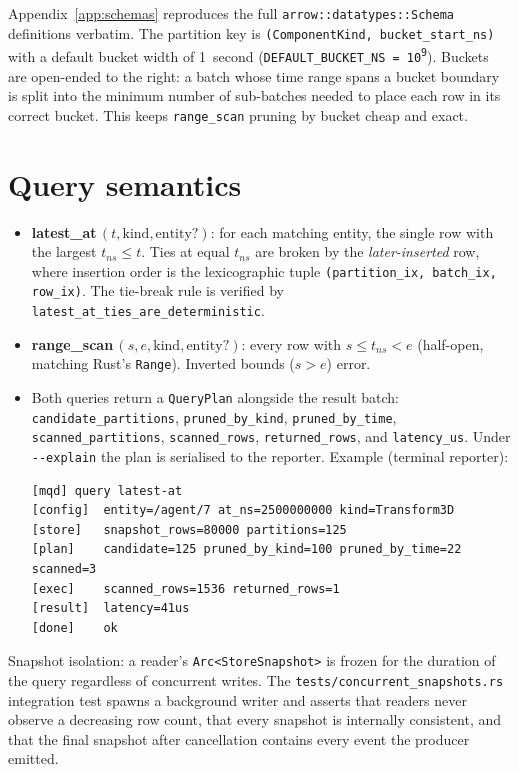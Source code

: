 \documentclass[11pt]{article}
\begin{document}
Appendix~\ref{app:schemas} reproduces the full \texttt{arrow::datatypes::Schema}
definitions verbatim. The partition key is \texttt{(ComponentKind, bucket\_start\_ns)}
with a default bucket width of 1~second (\texttt{DEFAULT\_BUCKET\_NS = 10\textsuperscript{9}}).
Buckets are open-ended to the right: a batch whose time range spans a bucket boundary
is split into the minimum number of sub-batches needed to place each row in its correct
bucket. This keeps \texttt{range\_scan} pruning by bucket cheap and exact.

\section{Query semantics}

\begin{itemize}
  \item \textbf{latest\_at}\,$(t, \mathrm{kind}, \mathrm{entity}?)$: for each matching
    entity, the single row with the largest $t_{ns} \le t$. Ties at equal $t_{ns}$ are
    broken by the \emph{later-inserted} row, where insertion order is the lexicographic
    tuple \texttt{(partition\_ix, batch\_ix, row\_ix)}. The tie-break rule is
    verified by \texttt{latest\_at\_ties\_are\_deterministic}.
  \item \textbf{range\_scan}\,$(s, e, \mathrm{kind}, \mathrm{entity}?)$: every row
    with $s \le t_{ns} < e$ (half-open, matching Rust's \texttt{Range}). Inverted
    bounds ($s > e$) error.
  \item Both queries return a \texttt{QueryPlan} alongside the result batch:
    \texttt{candidate\_partitions}, \texttt{pruned\_by\_kind}, \texttt{pruned\_by\_time},
    \texttt{scanned\_partitions}, \texttt{scanned\_rows}, \texttt{returned\_rows},
    and \texttt{latency\_us}. Under \texttt{-{}-explain} the plan is serialised to the
    reporter. Example (terminal reporter):

\begin{lstlisting}
[mqd] query latest-at
[config]  entity=/agent/7 at_ns=2500000000 kind=Transform3D
[store]   snapshot_rows=80000 partitions=125
[plan]    candidate=125 pruned_by_kind=100 pruned_by_time=22 scanned=3
[exec]    scanned_rows=1536 returned_rows=1
[result]  latency=41us
[done]    ok
\end{lstlisting}
\end{itemize}

Snapshot isolation: a reader's \texttt{Arc<StoreSnapshot>} is frozen for the duration
of the query regardless of concurrent writes. The
\texttt{tests/concurrent\_snapshots.rs} integration test spawns a background writer and
asserts that readers never observe a decreasing row count, that every snapshot is
internally consistent, and that the final snapshot after cancellation contains every
event the producer emitted.
\end{document}
